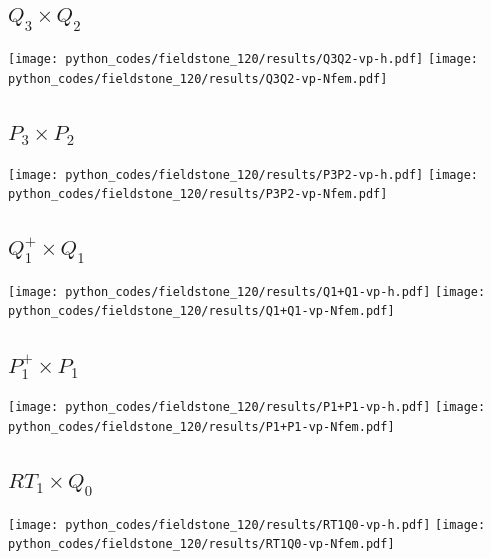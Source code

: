 \subsection*{$Q_3\times Q_2$}
\begin{center}
\texttt{[image: python\_codes/fieldstone\_120/results/Q3Q2-vp-h.pdf]}
\texttt{[image: python\_codes/fieldstone\_120/results/Q3Q2-vp-Nfem.pdf]}
\end{center}

\subsection*{$P_3\times P_2$}
\begin{center}
\texttt{[image: python\_codes/fieldstone\_120/results/P3P2-vp-h.pdf]}
\texttt{[image: python\_codes/fieldstone\_120/results/P3P2-vp-Nfem.pdf]}
\end{center}

\newpage
\subsection*{$Q_1^+\times Q_1$}
\begin{center}
\texttt{[image: python\_codes/fieldstone\_120/results/Q1+Q1-vp-h.pdf]}
\texttt{[image: python\_codes/fieldstone\_120/results/Q1+Q1-vp-Nfem.pdf]}
\end{center}

\subsection*{$P_1^+\times P_1$}
\begin{center}
\texttt{[image: python\_codes/fieldstone\_120/results/P1+P1-vp-h.pdf]}
\texttt{[image: python\_codes/fieldstone\_120/results/P1+P1-vp-Nfem.pdf]}
\end{center}

\subsection*{$RT_1\times Q_0$}
\begin{center}
\texttt{[image: python\_codes/fieldstone\_120/results/RT1Q0-vp-h.pdf]}
\texttt{[image: python\_codes/fieldstone\_120/results/RT1Q0-vp-Nfem.pdf]}
\end{center}

